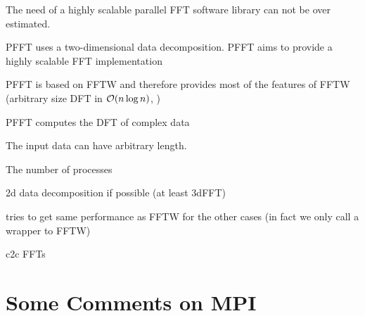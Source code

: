 % 


The need of a highly scalable parallel FFT software library can not be over estimated. 

PFFT uses a two-dimensional data decomposition.
PFFT aims to provide a highly scalable FFT implementation

\begin{compactitem}
  \item PFFT is based on FFTW \cite{fftw} and therefore provides most of the features of FFTW
        (arbitrary size DFT in $\mathcal{O}(n \log n)$, )
  \item PFFT computes the DFT of complex data
  \item The input data can have arbitrary length.
  \item The number of processes 
\end{compactitem}


\begin{compactitem}
  \item 2d data decomposition if possible (at least 3dFFT)
  \item tries to get same performance as FFTW for the other cases (in fact we only call a wrapper to FFTW)
  \item c2c FFTs
\end{compactitem}

\section{Some Comments on MPI}

